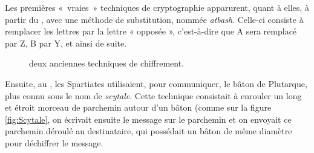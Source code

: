 Les premières «~vraies~» techniques de cryptographie apparurent,
quant à elles, à partir du , avec une méthode de substitution,
nommée \emph{atbash}. Celle-ci consiste à remplacer les lettres par la
lettre « opposée », c'est-à-dire que A sera remplacé par Z, B par Y,
et ainsi de suite.
\begin{figure}[h]
  \centering
    \hspace{1.5cm}
    \caption{deux anciennes techniques de chiffrement.}
    \vspace{-15pt}
\end{figure}


  
Ensuite, au , les Spartiates utilisaient, pour communiquer, le
bâton de Plutarque, plus connu sous le nom de \emph{scytale}. Cette
technique consistait à enrouler un long et étroit morceau de parchemin
autour d'un bâton (comme sur la figure \ref{fig:Scytale}, on écrivait 
ensuite le message sur le parchemin et
on envoyait ce parchemin déroulé au destinataire, qui possédait un
bâton de même diamètre pour déchiffrer le message.

